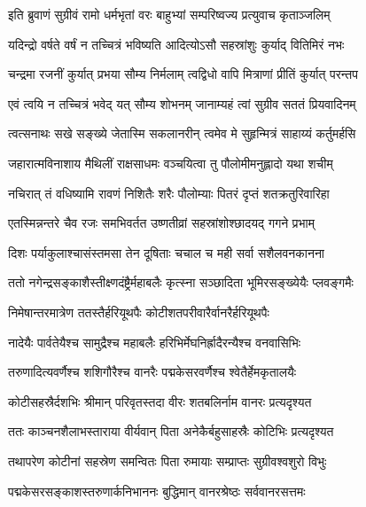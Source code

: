 
\twolineshloka
{इति ब्रुवाणं सुग्रीवं रामो धर्मभृतां वरः}
{बाहुभ्यां सम्परिष्वज्य प्रत्युवाच कृताञ्जलिम्} %

\twolineshloka
{यदिन्द्रो वर्षते वर्षं न तच्चित्रं भविष्यति}
{आदित्योऽसौ सहस्रांशुः कुर्याद् वितिमिरं नभः} %

\twolineshloka
{चन्द्रमा रजनीं कुर्यात् प्रभया सौम्य निर्मलाम्}
{त्वद्विधो वापि मित्राणां प्रीतिं कुर्यात् परन्तप} %

\twolineshloka
{एवं त्वयि न तच्चित्रं भवेद् यत् सौम्य शोभनम्}
{जानाम्यहं त्वां सुग्रीव सततं प्रियवादिनम्} %

\twolineshloka
{त्वत्सनाथः सखे सङ्ख्ये जेतास्मि सकलानरीन्}
{त्वमेव मे सुहृन्मित्रं साहाय्यं कर्तुमर्हसि} %

\twolineshloka
{जहारात्मविनाशाय मैथिलीं राक्षसाधमः}
{वञ्चयित्वा तु पौलोमीमनुह्लादो यथा शचीम्} %

\twolineshloka
{नचिरात् तं वधिष्यामि रावणं निशितैः शरैः}
{पौलोम्याः पितरं दृप्तं शतक्रतुरिवारिहा} %

\twolineshloka
{एतस्मिन्नन्तरे चैव रजः समभिवर्तत}
{उष्णतीव्रां सहस्रांशोश्छादयद् गगने प्रभाम्} %

\twolineshloka
{दिशः पर्याकुलाश्चासंस्तमसा तेन दूषिताः}
{चचाल च मही सर्वा सशैलवनकानना} %

\twolineshloka
{ततो नगेन्द्रसङ्काशैस्तीक्ष्णदंष्ट्रैर्महाबलैः}
{कृत्स्ना सञ्छादिता भूमिरसङ्ख्येयैः प्लवङ्गमैः} %

\twolineshloka
{निमेषान्तरमात्रेण ततस्तैर्हरियूथपैः}
{कोटीशतपरीवारैर्वानरैर्हरियूथपैः} %

\twolineshloka
{नादेयैः पार्वतेयैश्च सामुद्रैश्च महाबलैः}
{हरिभिर्मेघनिर्ह्रादैरन्यैश्च वनवासिभिः} %

\twolineshloka
{तरुणादित्यवर्णैश्च शशिगौरैश्च वानरैः}
{पद्मकेसरवर्णैश्च श्वेतैर्हेमकृतालयैः} %

\twolineshloka
{कोटीसहस्रैर्दशभिः श्रीमान् परिवृतस्तदा}
{वीरः शतबलिर्नाम वानरः प्रत्यदृश्यत} %

\twolineshloka
{ततः काञ्चनशैलाभस्ताराया वीर्यवान् पिता}
{अनेकैर्बहुसाहस्रैः कोटिभिः प्रत्यदृश्यत} %

\twolineshloka
{तथापरेण कोटीनां सहस्रेण समन्वितः}
{पिता रुमायाः सम्प्राप्तः सुग्रीवश्वशुरो विभुः} %

\twolineshloka
{पद्मकेसरसङ्काशस्तरुणार्कनिभाननः}
{बुद्धिमान् वानरश्रेष्ठः सर्ववानरसत्तमः} %

